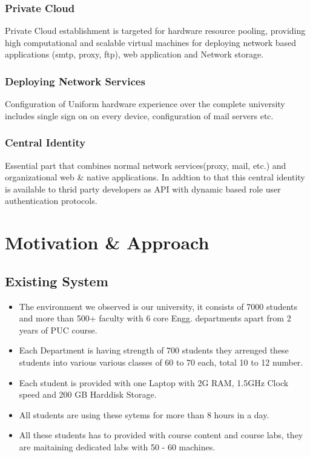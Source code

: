 \documentclass[12pt]{report}
\begin{document}
\subsection{Private Cloud}

	Private Cloud establishment is targeted for hardware resource pooling, providing high computational and scalable virtual machines for deploying network based applications (smtp, proxy, ftp), web application and Network storage.
	
\subsection{Deploying Network Services}

	Configuration of Uniform hardware experience over the complete university includes single sign on on every device, configuration of mail servers etc.
	
\subsection{Central Identity}

	Essential part that combines normal network services(proxy, mail, etc.) and organizational web \& native applications. In addtion to that this central identity is available to thrid party developers as API with dynamic based role user authentication protocols.	
	

\chapter{Motivation \& Approach}

\section{Existing System}


\begin{itemize}
	\item The environment we observed is our university, it consists of 7000 students and more than 500+ faculty with 6 core Engg. departments apart from 2 years of PUC course.
	\item Each Department is having strength of 700 students they arrenged these students into various various classes of 60 to 70 each, total 10 to 12 number. 
	\item Each student is provided with one Laptop with 2G RAM, 1.5GHz Clock speed and 200 GB Harddisk Storage. 
	\item All students are using these sytems for more than 8 hours in a day.
	\item All these students has to provided with course content and course labs, they are maitaining dedicated labs with 50 - 60 machines.
	
\end{itemize}
\end{document}
